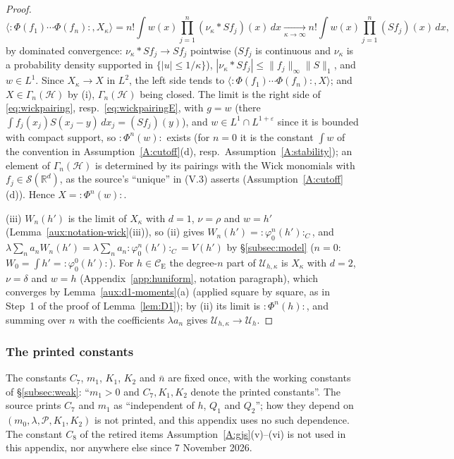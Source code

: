 \documentclass[11pt,a4paper]{article}
\theoremstyle{plain}
\theoremstyle{definition}
\theoremstyle{plain}
\theoremstyle{definition}
\newcommand{\R}{\mathbb{R}}
\newcommand{\CE}{\mathcal{C}_{\mathrm E}}
\newcommand{\HH}{\mathcal{H}}
\newcommand{\ip}[2]{\langle #1,#2\rangle}
\begin{document}
\begin{proof}
\[
 \ip{{:}\Phi(f_1)\cdots\Phi(f_n){:}}{X_\kappa}
 =n!\int w(x)\prod_{j=1}^n(\nu_\kappa*Sf_j)(x)\,dx
 \xrightarrow[\kappa\to\infty]{}n!\int w(x)\prod_{j=1}^n(Sf_j)(x)\,dx ,
\]
by dominated convergence: $\nu_\kappa*Sf_j\to Sf_j$ pointwise ($Sf_j$ is continuous and
$\nu_\kappa$ is a probability density supported in $\{|u|\le1/\kappa\}$), $|\nu_\kappa*Sf_j|\le
\|f_j\|_\infty\|S\|_1$, and $w\in L^1$.  Since $X_\kappa\to X$ in $L^2$, the left side tends to
$\ip{{:}\Phi(f_1)\cdots\Phi(f_n){:}}X$; and $X\in\Gamma_n(\HH)$ by (i), $\Gamma_n(\HH)$ being
closed.  The limit is the right side of \eqref{eq:wickpairing}, resp.\ \eqref{eq:wickpairingE},
with $g=w$ (there $\int f_j(x_j)S(x_j-y)\,dx_j=(Sf_j)(y)$), and $w\in L^1\cap L^{1+\varepsilon}$
since it is bounded with compact support, so ${:}\Phi^n(w){:}$ exists (for $n=0$ it is the
constant $\int w$ of the convention in Assumption~\ref{A:cutoff}(d), resp.\
Assumption~\ref{A:stability}); an element of $\Gamma_n(\HH)$ is
determined by its pairings with the Wick monomials with $f_j\in\mathcal S(\R^d)$, as the
source's ``unique'' in (V.3) asserts (Assumption~\ref{A:cutoff}(d)).
Hence $X={:}\Phi^n(w){:}$.

(iii) $W_n(h')$ is the limit of $X_\kappa$ with $d=1$, $\nu=\rho$ and $w=h'$
(Lemma~\ref{aux:notation-wick}(iii)), so (ii) gives $W_n(h')={:}\varphi_0^n(h'){:}_C$, and
$\lambda\sum_na_nW_n(h')=\lambda\sum_na_n{:}\varphi_0^n(h'){:}_C=V(h')$ by
\S\ref{subsec:model} ($n=0$: $W_0=\int h'={:}\varphi_0^0(h'){:}$).  For $h\in\CE$ the
degree-$n$ part of $\mathcal U_{h,\kappa}$ is $X_\kappa$ with $d=2$, $\nu=\delta$ and $w=h$
(Appendix~\ref{app:huniform}, notation paragraph), which converges by
Lemma~\ref{aux:d1-moments}(a) (applied square by square, as in Step~1 of the proof of
Lemma~\ref{lem:D1}); by (ii) its limit is ${:}\Phi^n(h){:}$, and summing over $n$ with the
coefficients $\lambda a_n$ gives $\mathcal U_{h,\kappa}\to\mathcal U_h$.
\end{proof}

\subsubsection{The printed constants}\label{sec:notation-printed}

The constants $C_7$, $m_1$, $K_1$, $K_2$ and $\bar n$ are fixed once, with the working
constants of \S\ref{subsec:weak}: ``$m_1>0$ and $C_7,K_1,K_2$ denote the
printed constants''.  The source prints $C_7$ and $m_1$ as ``independent of $h$, $Q_1$ and
$Q_2$''; how they depend on $(m_0,\lambda,\mathscr P,K_1,K_2)$ is not printed, and this appendix
uses no such dependence.  The constant $C_8$ of the retired items
Assumption~\ref{A:gjs}(v)--(vi) is not used in this appendix, nor anywhere else since
7 November 2026.
\end{document}

